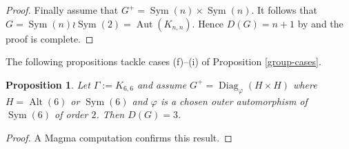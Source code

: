 \documentclass[11pt]{amsart}
\newtheorem{proposition}[theorem]{Proposition}
\DeclareMathOperator{\Sym}{Sym}
\DeclareMathOperator{\Alt}{Alt}
\DeclareMathOperator{\Aut}{Aut}
\DeclareMathOperator{\Diag}{Diag}
\begin{document}
\begin{proof}
Finally assume that $G^+=\Sym(n)\times \Sym(n)$. It follows that   $G=\Sym(n)\wr \Sym(2) = \Aut(K_{n,n})$. Hence $D(G)=n+1$ by \cite[Theorem 2.4]{CT2006} and the proof is complete.




\end{proof}




The following propositions tackle cases (f)--(i) of Proposition \ref{group-cases}.


\begin{proposition}\label{prop:DGdiag-outer}
Let \(\Gamma:=K_{6,6}\) and assume \(G^+= \Diag_\varphi(H \times H)\)  where $H=\Alt(6)$ or $\Sym(6)$ and $\varphi$ is a chosen outer automorphism of $\Sym(6)$ of order $2$. Then \(D(G)=3\).
\end{proposition}
\begin{proof}
A {\sc Magma} computation confirms this result.
\end{proof}
\end{document}
